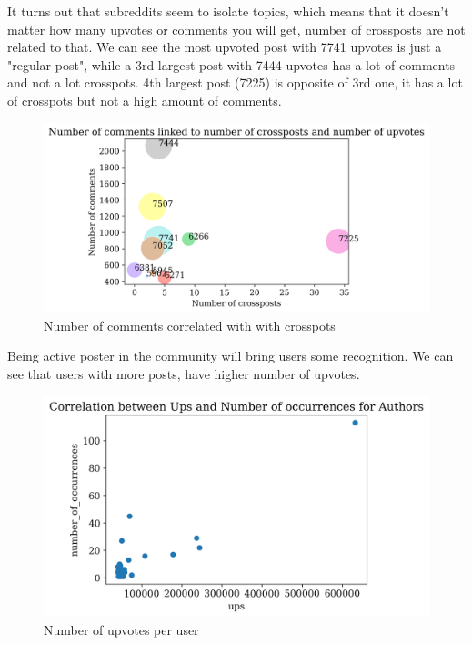 It turns out that subreddits seem to isolate topics, which means that it doesn't matter how many upvotes or comments you will get, number of crossposts are not related to that. We can see the most upvoted post with 7741 upvotes is just a "regular post", while a 3rd largest post with 7444 upvotes has a lot of comments and not a lot crosspots. 4th largest post (7225) is opposite of 3rd one, it has a lot of crosspots but not a high amount of comments.
\begin{figure}[H]
\includegraphics[scale=0.70]{img/A1/num_crossposts_scatterplot.png}
\centering
\caption{Number of comments correlated with with crosspots}
\label{fig:num_crossposts_scatterplot}
\end{figure}

Being active poster in the community will bring users some recognition. We can see that users with more posts, have higher number of upvotes.
\begin{figure}[H]
\includegraphics[scale=0.80]{img/A1/ups_scatterplot_simple.png}
\centering
\caption{Number of upvotes per user}
\label{fig:ups_scatterplot_simple}
\end{figure}

